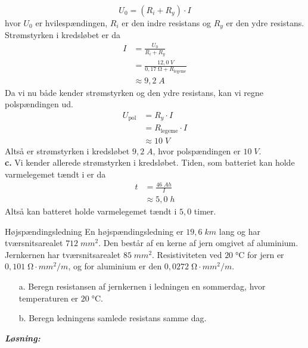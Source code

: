 \documentclass{report}
\newcommand{\sol}{\setlength{\parindent}{0cm}\textbf{\textit{Løsning:}}\setlength{\parindent}{1cm}}
\begin{document}
\[
U_0=(R_i+R_y) \cdot I
\] 
hvor $U_0$ er hvilespændingen, $R_i$ er den indre resistans og $R_y$ er den ydre resistans. 
Strømstyrken i kredsløbet er da
\begin{equation*}
\begin{split}
  I&=\frac{U_0}{R_i+R_y}\\ 
  &=\frac{12,0 \;\unit{V} }{0,17 \;\unit{\ohm} + R_{\text{legeme} }}\\ 
  &\approx 9,2 \;\unit{A} 
\end{split}
\end{equation*}
Da vi nu både kender strømstyrken og den ydre resistans, kan vi regne polspændingen ud.
\begin{equation*}
\begin{split}
  U_{\text{pol} }&=R_y \cdot I\\ 
  &=R_{\text{legeme} } \cdot I\\ 
  &\approx 10 \;\unit{V} 
\end{split}
\end{equation*}
Altså er strømstyrken i kredsløbet $9,2 \;\unit{A} $, hvor polspændingen er $10 \;\unit{V} $.\\[1ex]
\textbf{c.}
Vi kender allerede strømstyrken i kredsløbet.
Tiden, som batteriet kan holde varmelegemet tændt i er da
\begin{equation*}
\begin{split}
  t&=\frac{46 \;\unit{Ah} }{I}\\ 
  &\approx 5,0 \;\unit{h} 
\end{split}
\end{equation*}
Altså kan batteret holde varmelegemet tændt i $5,0$ timer.
\newpage
\begin{question}{Højspændingsledning}{}
  En højspændingsledning er $19,6 \;\unit{km}$ lang og har tværsnitsarealet $712 \;\unit{mm^2} $. 
  Den består af en kerne af jern omgivet af aluminium. Jernkernen har tværsnitsarealet $85 \;\unit{mm^2} $.
Resistiviteten ved $20 \;\unit{\celsius} $ for jern er $0,101 \;\unit{\ohm \cdot mm^2/m} $, og for aluminium er den $0,0272 \;\unit{\ohm \cdot mm^2/m} $.
\begin{itemize}
  \item[a.] Beregn resistansen af jernkernen i ledningen en sommerdag, hvor temperaturen er $20 \;\unit{\celsius} $.
  \item[b.] Beregn ledningens samlede resistans samme dag.
\end{itemize}
\end{question}
\sol \\
\end{document}
